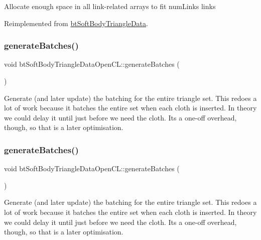 Allocate enough space in all link-\/related arrays to fit num\+Links links 

Reimplemented from \hyperlink{classbtSoftBodyTriangleData}{bt\+Soft\+Body\+Triangle\+Data}.

\mbox{\label{classbtSoftBodyTriangleDataOpenCL_a9c2ced4b9c5114595129ded0706e33c1}} 
\subsubsection{\texorpdfstring{generate\+Batches()}{generateBatches()}\hspace{0.1cm}{\footnotesize\ttfamily [1/2]}}
{\footnotesize\ttfamily void bt\+Soft\+Body\+Triangle\+Data\+Open\+C\+L\+::generate\+Batches (\begin{DoxyParamCaption}{ }\end{DoxyParamCaption})}

Generate (and later update) the batching for the entire triangle set. This redoes a lot of work because it batches the entire set when each cloth is inserted. In theory we could delay it until just before we need the cloth. It\textquotesingle{}s a one-\/off overhead, though, so that is a later optimisation. \mbox{\label{classbtSoftBodyTriangleDataOpenCL_a9c2ced4b9c5114595129ded0706e33c1}} 
\subsubsection{\texorpdfstring{generate\+Batches()}{generateBatches()}\hspace{0.1cm}{\footnotesize\ttfamily [2/2]}}
{\footnotesize\ttfamily void bt\+Soft\+Body\+Triangle\+Data\+Open\+C\+L\+::generate\+Batches (\begin{DoxyParamCaption}{ }\end{DoxyParamCaption})}

Generate (and later update) the batching for the entire triangle set. This redoes a lot of work because it batches the entire set when each cloth is inserted. In theory we could delay it until just before we need the cloth. It\textquotesingle{}s a one-\/off overhead, though, so that is a later optimisation. \mbox{\label{classbtSoftBodyTriangleDataOpenCL_ab03606a0597e8990959452d975ec7bf2}} 

